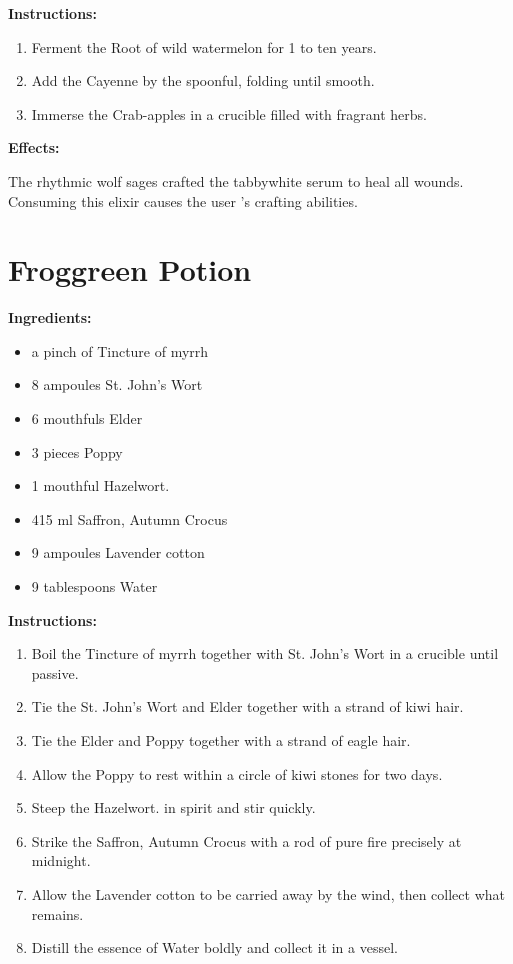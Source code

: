 \documentclass{article}
\begin{document}
\textbf{Instructions:}

\begin{enumerate}
  \item Ferment the Root of wild watermelon for 1 to ten years.
  \item Add the Cayenne by the spoonful, folding until smooth.
  \item Immerse the Crab-apples in a crucible filled with fragrant herbs.
\end{enumerate}

\textbf{Effects:}

The rhythmic wolf sages crafted the tabbywhite serum to heal all wounds. Consuming this elixir causes the user 's crafting abilities.

\newpage
\section*{Froggreen Potion}

\textbf{Ingredients:}

\begin{itemize}
  \item a pinch of Tincture of myrrh
  \item 8 ampoules St. John's Wort
  \item 6 mouthfuls Elder
  \item 3 pieces Poppy
  \item 1 mouthful Hazelwort.
  \item 415 ml Saffron, Autumn Crocus
  \item 9 ampoules Lavender cotton
  \item 9 tablespoons Water
\end{itemize}

\textbf{Instructions:}

\begin{enumerate}
  \item Boil the Tincture of myrrh together with St. John's Wort in a crucible until passive.
  \item Tie the St. John's Wort and Elder together with a strand of kiwi hair.
  \item Tie the Elder and Poppy together with a strand of eagle hair.
  \item Allow the Poppy to rest within a circle of kiwi stones for two days.
  \item Steep the Hazelwort. in spirit and stir quickly.
  \item Strike the Saffron, Autumn Crocus with a rod of pure fire precisely at midnight.
  \item Allow the Lavender cotton to be carried away by the wind, then collect what remains.
  \item Distill the essence of Water boldly and collect it in a vessel.
\end{enumerate}
\end{document}
